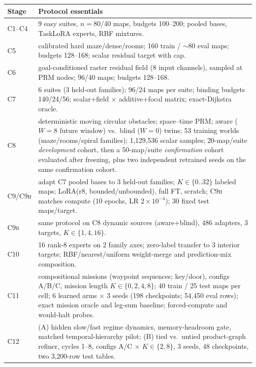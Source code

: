 \documentclass[letterpaper]{article} %
\newcommand{\stage}[1]{\textsc{#1}}
\begin{document}
\begin{table}[h]
\centering
\footnotesize
\begin{tabular}{@{}lp{5.6cm}@{}}
\toprule
Stage & Protocol essentials \\
\midrule
\stage{C1--C4} & 9 easy suites, $n{=}80$/40 maps, budgets 100--200; pooled bases, TaskLoRA experts, RBF mixtures. \\
\stage{C5} & calibrated hard maze/dense/rooms; 160 train / $\sim$80 eval maps; budgets 128--168; scalar residual target with cap. \\
\stage{C6} & goal-conditioned raster residual field (8 input channels), sampled at PRM nodes; 96/40 maps; budgets 128--168. \\
\stage{C7} & 6 suites (3 held-out families); 96/24 maps per suite; binding budgets 140/24/56; scalar+field $\times$ additive+focal matrix; exact-Dijkstra oracle. \\
\stage{C8} & deterministic moving circular obstacles; space--time PRM; aware ($W{=}8$ future window) vs.\ blind ($W{=}0$) twins; 53 training worlds (maze/rooms/spiral families); 1{,}129{,}536 scalar samples; 20-map/suite \emph{development} cohort, then a 50-map/suite \emph{confirmation} cohort evaluated after freezing, plus two independent retrained seeds on the same confirmation cohort. \\
\stage{C9/C9h} & adapt \stage{C7} pooled bases to 3 held-out families; $K\in\{0..32\}$ labeled maps; LoRA(r8, bounded/unbounded), full FT, scratch; \stage{C9h} matches compute (10 epochs, LR $2{\times}10^{-4}$); 30 fixed test maps/target. \\
\stage{C9b} & same protocol on \stage{C8} dynamic sources (aware+blind), 486 adapters, 3 targets, $K\in\{1,4,16\}$. \\
\stage{C10} & 16 rank-8 experts on 2 family axes; zero-label transfer to 3 interior targets; RBF/nearest/uniform weight-merge and prediction-mix composition. \\
\stage{C11} & compositional missions (waypoint sequences; key/door), configs A/B/C, mission length $K\in\{0,2,4,8\}$; 40 train / 25 test maps per cell; 6 learned arms $\times$ 3 seeds (198 checkpoints; 54{,}450 eval rows); exact mission oracle and leg-sum baseline; forced-compute and would-halt probes. \\
\stage{C12} & (A) hidden slow/fast regime dynamics, memory-headroom gate, matched temporal-hierarchy pilot; (B) tied vs.\ untied product-graph refiner, cycles 1--8, configs A/C $\times$ $K\in\{2,8\}$, 3 seeds, 48 checkpoints, two 3{,}200-row test tables. \\

\end{tabular}
\end{table}
\end{document}
